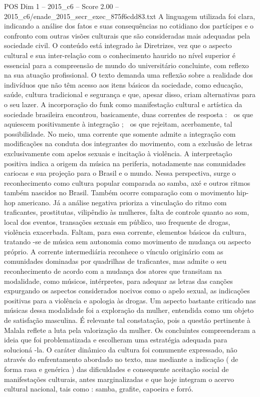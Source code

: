 \begin{textsample}{POS Dim 1 – 2015\_c6 – Score 2.00 – 2015\_c6/enade\_2015\_secr\_exec\_875f6cdd83.txt}
A linguagem utilizada foi clara, indicando a análise dos fatos e suas consequências no cotidiano dos partícipes e o confronto com outras visões culturais que são consideradas mais adequadas pela sociedade civil.
O conteúdo está integrado às Diretrizes, vez que o aspecto cultural e sua inter-relação com o conhecimento haurido no nível superior é essencial para a compreensão de mundo do universitário concluinte, com reflexo na sua atuação profissional.
O texto demanda uma reflexão sobre a realidade dos indivíduos que não têm acesso aos itens básicos da sociedade, como educação, saúde, cultura tradicional e segurança e que, apesar disso, criam alternativas para o seu lazer.
A incorporação do funk como manifestação cultural e artística da sociedade brasileira encontrou, basicamente, duas correntes de resposta :  os que aquiescem positivamente à integração ;  os que rejeitam, acerbamente, tal possibilidade.
No meio, uma corrente que somente admite a integração com modificações na conduta dos integrantes do movimento, com a exclusão de letras exclusivamente com apelos sexuais e incitação à violência.
A interpretação positiva indica a origem da música na periferia, notadamente nas comunidades cariocas e sua projeção para o Brasil e o mundo.
Nessa perspectiva, surge o reconhecimento como cultura popular comparada ao samba, axé e outros ritmos também nascidos no Brasil.
Também ocorre comparação com o movimento hip-hop americano.
Já a análise negativa prioriza a vinculação do ritmo com traficantes, prostitutas, vilipêndio às mulheres, falta de controle quanto ao som, local dos eventos, transações sexuais em público, uso frequente de drogas, violência exacerbada.
Faltam, para essa corrente, elementos básicos da cultura, tratando -se de música sem autonomia como movimento de mudança ou aspecto próprio.
A corrente intermediária reconhece o vínculo originário com as comunidades dominadas por quadrilhas de traficantes, mas admite o seu reconhecimento de acordo com a mudança dos atores que transitam na modalidade, como músicos, intérpretes, para adequar as letras das canções expurgando os aspectos considerados nocivos como o apelo sexual, as indicações positivas para a violência e apologia às drogas.
Um aspecto bastante criticado nas músicas dessa modalidade foi a exploração da mulher, entendida como um objeto de satisfação masculina.
É relevante tal constatação, pois a questão pertinente à Malala reflete a luta pela valorização da mulher.
Os concluintes compreenderam a ideia que foi problematizada e escolheram uma estratégia adequada para solucioná -la.
O caráter dinâmico da cultura foi comumente expressado, não através do enfrentamento abordado no texto, mas mediante a indicação ( de forma rasa e genérica ) das dificuldades e consequente aceitação social de manifestações culturais, antes marginalizadas e que hoje integram o acervo cultural nacional, tais como : samba, grafite, capoeira e forró.

\end{textsample}
